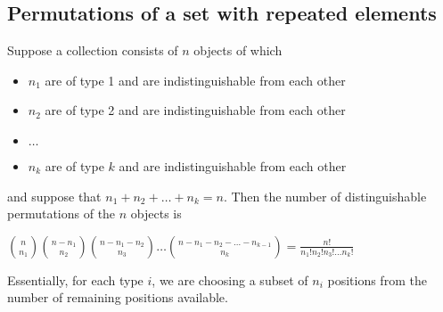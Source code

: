 \documentclass[a4paper]{article}
\begin{document}
\subsection{Permutations of a set with repeated elements}
Suppose a collection consists of $n$ objects of which
\begin{itemize}
	\item[] $n_1$ are of type 1 and are indistinguishable from each other
	\item[] $n_2$ are of type 2 and are indistinguishable from each other
	\item[] $\dots$
	\item[] $n_k$ are of type $k$ and are indistinguishable from each other 
\end{itemize}
and suppose that $n_1 + n_2 + \dots + n_k = n$. Then the number of distinguishable permutations of the $n$ objects is
\begin{center}
	${n\choose n_1}{n-n_1\choose n_2}{n-n_1-n_2\choose n_3}\dots{n-n_1-n_2-\dots-n_{k-1}\choose n_k} = \frac{n!}{n_1!n_2!n_3!\dots n_k!}$
\end{center}
Essentially, for each type $i$, we are choosing a subset of $n_i$ positions from the number of remaining positions available.
\end{document}
